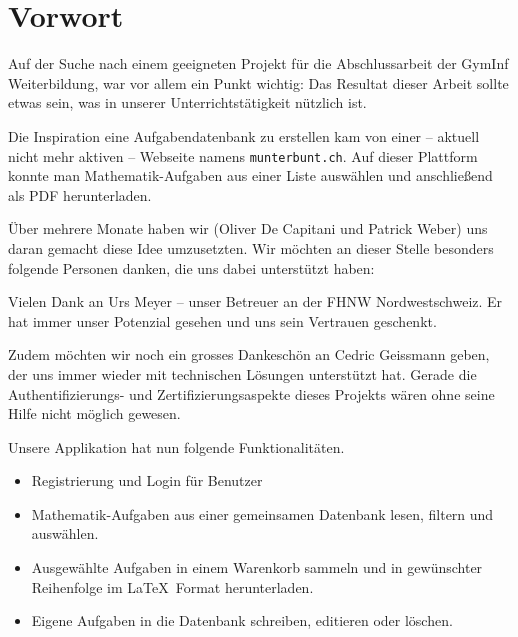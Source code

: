 \section{Vorwort}

Auf der Suche nach einem geeigneten Projekt für die Abschlussarbeit der GymInf Weiterbildung, war vor allem ein Punkt wichtig: Das Resultat dieser Arbeit sollte etwas sein, was in unserer Unterrichtstätigkeit nützlich ist. 

Die Inspiration eine Aufgabendatenbank zu erstellen kam von einer -- aktuell nicht mehr aktiven -- Webseite namens \verb|munterbunt.ch|. Auf dieser Plattform konnte man Mathematik-Aufgaben aus einer Liste auswählen und anschließend als PDF herunterladen.

Über mehrere Monate haben wir (Oliver De Capitani und Patrick Weber) uns daran gemacht diese Idee umzusetzten. Wir möchten an dieser Stelle besonders folgende Personen danken, die uns dabei unterstützt haben: 

Vielen Dank an Urs Meyer -- unser Betreuer an der FHNW Nordwestschweiz. Er hat immer unser Potenzial gesehen und uns sein Vertrauen geschenkt. 

Zudem möchten wir noch ein grosses Dankeschön an Cedric Geissmann geben, der uns immer wieder mit technischen Lösungen unterstützt hat. Gerade die Authentifizierungs- und Zertifizierungsaspekte dieses Projekts wären ohne seine Hilfe nicht möglich gewesen.

Unsere Applikation hat nun folgende Funktionalitäten.
\begin{itemize}
  \item Registrierung und Login für Benutzer
  \item Mathematik-Aufgaben aus einer gemeinsamen Datenbank lesen, filtern und auswählen.
  \item Ausgewählte Aufgaben in einem Warenkorb sammeln und in gewünschter Reihenfolge im \LaTeX\  Format herunterladen.
  \item Eigene Aufgaben in die Datenbank schreiben, editieren oder löschen.
\end{itemize}

